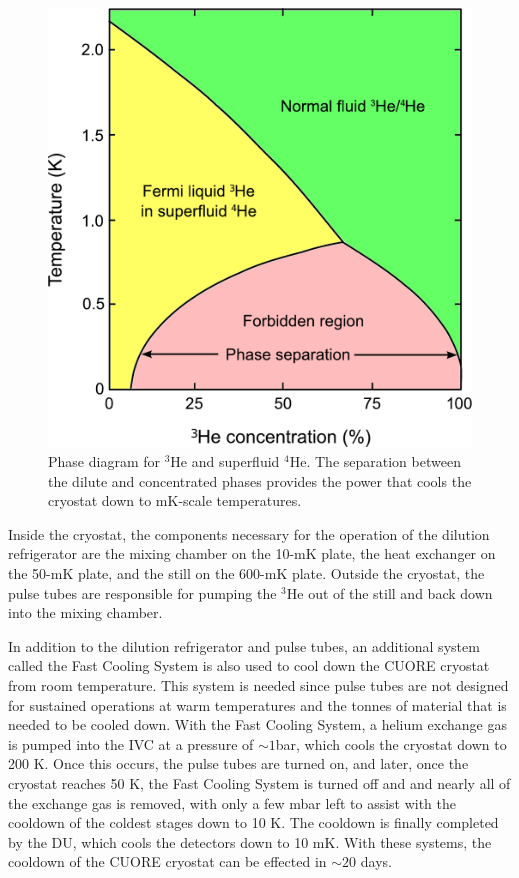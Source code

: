 \begin{figure}[htbp]
    \centering
    \includegraphics[width=0.6\linewidth]{Figures/Helium_phase_diagram.pdf}
    \caption[Phase diagram for $^{3}$He and superfluid $^{4}$He.]
    {Phase diagram for $^{3}$He and superfluid $^{4}$He.
    The separation between the dilute and concentrated phases provides the power that cools the cryostat down to mK-scale temperatures.}
    \label{fig:He_phase_diagram}
\end{figure}

Inside the cryostat, the components necessary for the operation of the dilution refrigerator are the mixing chamber on the 10-mK plate, the heat exchanger on the 50-mK plate, and the still on the 600-mK plate.
Outside the cryostat, the pulse tubes are responsible for pumping the $^3$He out of the still and back down into the mixing chamber.

In addition to the dilution refrigerator and pulse tubes, an additional system called the Fast Cooling System is also used to cool down the CUORE cryostat from room temperature.
This system is needed since pulse tubes are not designed for sustained operations at warm temperatures and the tonnes of material that is needed to be cooled down.
With the Fast Cooling System, a helium exchange gas is pumped into the IVC at a pressure of $\sim1$bar, which cools the cryostat down to 200 K.
Once this occurs, the pulse tubes are turned on, and later, once the cryostat reaches 50 K, the Fast Cooling System is turned off and and nearly all of the exchange gas is removed, with only a few mbar left to assist with the cooldown of the coldest stages down to 10 K.
The cooldown is finally completed by the DU, which cools the detectors down to 10 mK.
With these systems, the cooldown of the CUORE cryostat can be effected in $\sim20$ days.

